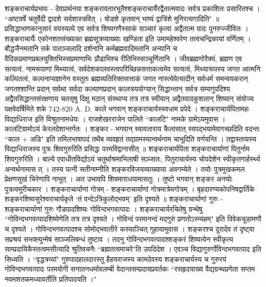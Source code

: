 शङ्कराचार्यप्रभावः -
देवप्रार्थनया शङ्करावतारभूतैश्शङ्कराचार्यैरद्वैतात्मवादः सर्वत्र प्रकाशितः प्रसारितश्च ।
``अष्टवर्षे चतुर्वेदी द्वादशे सर्वशास्त्रवित् ।
षोडशे कृतवान् भाष्यं द्वात्रिंशे मुनिरत्यगादिति" ॥
प्रसिद्धाभाणकानुसारं वयस्यल्पे एव सर्वत्र शिष्यगणैस्साकं सञ्चारं कृत्वा अद्वैतात्म वादः पुनरुज्जीवितः । शङ्कराचार्यैः एकोनशतसंख्याका ब्रह्मसूत्रव्याख्याः खण्डिता इति उमामहेश्वरेण तत्वचन्द्रिकायां वर्णितम् । बौद्धजैनमतानि तर्क पातञ्जलादि दर्शनानि कर्मब्रह्मवादिमतानि अन्यानि च वैदिकप्रमाणप्रबलयुक्तिभिस्सप्रमाणाभिः प्रौढाभिश्च रीतिभिस्सञ्चूर्णितानि ।
जीवब्रह्मणोरैक्यं, ब्रह्मण एव सत्यत्वं, नामरूपाणां मिथ्यात्वं, सर्वदेशकालवस्त्वपरिच्छिन्नसत्ताकत्वमेव सत्यत्वं, मिथ्यारूपस्य जगत आत्मनि कल्पितत्वं, कल्पनाप्यज्ञानेन वस्तुतः ब्रह्मव्यतिरिक्तसत्ताकं जगत नास्त्येवेत्यादीन् सर्वधर्म समन्वयकरान् जगतश्शान्ति प्रदान् सर्वथा सर्वदा कल्याणप्रदान् कालत्रययोग्यान् सिद्धान्तान् सर्वत्र सम्यगुपदिश्य अद्वैतसिद्धान्तसंरक्षणाय चतसृषु दिक्षु मठान् संस्थाप्य तत्र तत्र स्वीयान् अद्वैतवादकुशलान् शिष्यान् संयोज्य पक्षवेदर्षिमिते शके 742-820 A. D. काले भगवान् शङ्कराचार्यस्स्वधाम प्रपेदे ।
शङ्कराचार्यपितामहः विद्याधिराज इति विश्रुतनामधेयः । राजशेखरराजेन पालिते ``कालटि" नामके ग्रामेऽयमुवास । कालटिग्रामोऽयं केरलदेशान्तर्गतः । शङ्कर - भगवान् स्वावताराय कैलासात् स्वपद्भयामेवागच्छदिति वदन्तः ``काल + अडि" इति तमिलभाषापदं तथैब व्यवहृतं तद्ग्रामस्यान्वर्थनाम चाभूदिति वर्णयन्ति । तद्वास्तव्यस्य विद्याधिराजस्य पुत्रः शिवगुरुरिति प्रसिद्धः परमविद्वानासीत् ॥
शङ्कराचार्यपिता
शङ्कराचार्याणां पितुर्नाम शिवगुरुरिति । बाल्ये एवाधीतविद्योऽयं चतुर्थाश्रमाभिलाषी सञ्जातः, पितुराचार्यस्य चोपदेशेन स्वीकृतगार्हर्स्थ्य अन्वर्थनामास त् । तस्य पत्नी सतीनाम्नीति शङ्करविजयव्याख्याया अवगम्येते । तयोः पुत्रमुखकमल प्रेक्षणसुखं चिरेणापि नाभूत् । अत उभावपि शिवमाराधयामासतुः । तुष्टो भगवान् शङ्कर अनयोः पुत्रत्वमूरीचकार ।
शङ्कराचार्याणां गोत्रम् -
शङ्कराचार्याणां गोत्रमात्रेयगोत्रम् । बृहदारण्यकोपनिषद्वार्तिके शङ्करशिष्यसुरेश्वराचार्यकृते `तं वन्देऽत्रिकुलोद्भवम्' इति दृश्यते ॥
शङ्कराचार्याणां गुरुः -
शङ्कराचार्याणां गुरुः गौडपादशिष्यः गोविन्दभगवत्पादः । शङ्कराचार्यरचितेषु ग्रन्थेषु ``गोविन्दभगवत्पादशिष्येणेति तत्र तत्र दृश्यते । गोविन्दं परमानन्दं मद्गुरुं प्रणतोऽस्म्यहम्" इति विवेकचूडामणौ च दृश्यते । गोविन्दभगवत्पादश्च सोमोद्भवातीरे कस्याञ्चित् गुहायामुवास । शङ्करश्च दूरादेव तं दृष्ट्वा सप्रश्रयं सभक्त्युन्मेषं साञ्जलिबन्धं तुष्टाव । तदनु गोविन्दभगवत्पादश्शङ्करं शिष्यत्वेन स्वीकृत्य साम्प्रदायिकैस्तत्वमसीत्यादि श्रुतिवचनैः ``ब्रह्मतत्वमाचरे"ति उपदिदेश । एवञ्च विद्यागुरुर्गोविन्दभगवत्पाद इति सिध्यति ।
``वृद्धत्रय्यां" गुरुपादहालदारस्तु हैहयराजस्य कामदेवस्य शङ्कराचार्यस्य च गुरुरयं गोविन्दभगवत्पादः परमयोगी सनातनधर्मावलम्बी वेदान्तसम्प्रदायप्रवर्तकः ``रसहृदयाख्य वैद्यग्रन्थप्रणेता सप्तम नवमशतकमध्यावर्तीति प्रतिपादयति ।"

